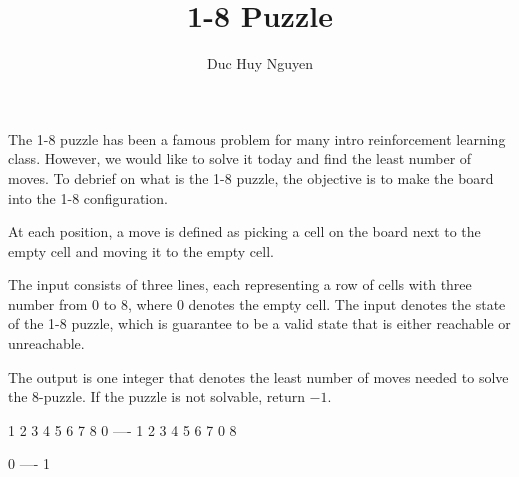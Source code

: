 \documentclass{article}
\title{1-8 Puzzle}
\author{Duc Huy Nguyen}
\begin{document}
\begin{problemDescription}
    The 1-8 puzzle has been a famous problem for many intro reinforcement learning class. However, we would like to solve it today and find the least number of moves.
    To debrief on what is the 1-8 puzzle, the objective is to make the board into the 1-8 configuration.
    
    At each position, a move is defined as picking a cell on the board next to the empty cell and moving it to the empty cell.

\end{problemDescription}

\begin{inputDescription}

    The input consists of three lines, each representing a row of cells with three number from $0$ to $8$, where $0$ denotes the empty cell. The input denotes the state of the 1-8 puzzle, which is guarantee to be a valid state that is either reachable or unreachable.

\end{inputDescription}

\begin{outputDescription}
    The output is one integer that denotes the least number of moves needed to solve the 8-puzzle. If the puzzle is not solvable, return $-1$.
\end{outputDescription}

\begin{sampleInput}
1 2 3
4 5 6
7 8 0
----
1 2 3
4 5 6
7 0 8
\end{sampleInput}
\begin{sampleOutput}
0
----
1
\end{sampleOutput}
\end{document}
